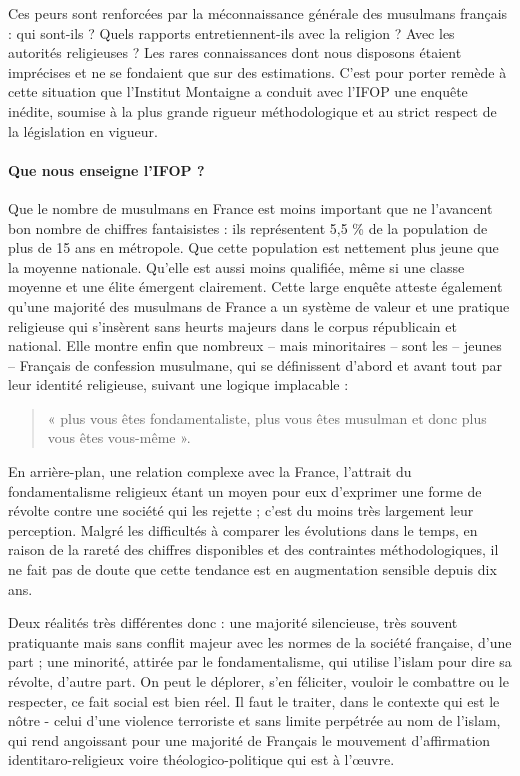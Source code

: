 Ces peurs sont renforcées par la méconnaissance générale des musulmans
français : qui sont-ils ? Quels rapports entretiennent-ils avec la
religion ? Avec les autorités religieuses ? Les rares connaissances dont
nous disposons étaient imprécises et ne se fondaient que sur des
estimations. C'est pour porter remède à cette situation que l'Institut
Montaigne a conduit avec l'IFOP une enquête inédite, soumise à la plus
grande rigueur méthodologique et au strict respect de la législation en
vigueur. \paragraph{Que nous enseigne l'IFOP ?} Que le nombre de musulmans en France
est moins important que ne l'avancent bon nombre de chiffres
fantaisistes : ils représentent 5,5 \% de la population de plus de 15
ans en métropole. Que cette population est nettement plus jeune que la
moyenne nationale. Qu'elle est aussi moins qualifiée, même si une classe
moyenne et une élite émergent clairement. Cette large enquête atteste
également qu'une majorité des musulmans de France a un système de valeur
et une pratique religieuse qui s'insèrent sans heurts majeurs dans le
corpus républicain et national. Elle montre enfin que nombreux -- mais
minoritaires -- sont les -- jeunes -- Français de confession musulmane,
qui se définissent d'abord et avant tout par leur identité religieuse,
suivant une logique implacable : 
\begin{quote}
    « plus vous êtes fondamentaliste, plus
vous êtes musulman et donc plus vous êtes vous-même ».
\end{quote} En arrière-plan,
une relation complexe avec la France, l'attrait du fondamentalisme
religieux étant un moyen pour eux d'exprimer une forme de révolte contre
une société qui les rejette ; c'est du moins très largement leur
perception. Malgré les difficultés à comparer les évolutions dans le
temps, en raison de la rareté des chiffres disponibles et des
contraintes méthodologiques, il ne fait pas de doute que cette tendance
est en augmentation sensible depuis dix ans.

Deux réalités très différentes donc : une majorité silencieuse, très
souvent pratiquante mais sans conflit majeur avec les normes de la
société française, d'une part ; une minorité, attirée par le
fondamentalisme, qui utilise l'islam pour dire sa révolte, d'autre part. On peut le déplorer, s'en féliciter, vouloir le
combattre ou le respecter, ce fait social est bien réel. Il faut le
traiter, dans le contexte qui est le nôtre - celui d'une violence
terroriste et sans limite perpétrée au nom de l'islam, qui rend
angoissant pour une majorité de Français le mouvement d'affirmation
identitaro-religieux voire théologico-politique qui est à l'œuvre.

